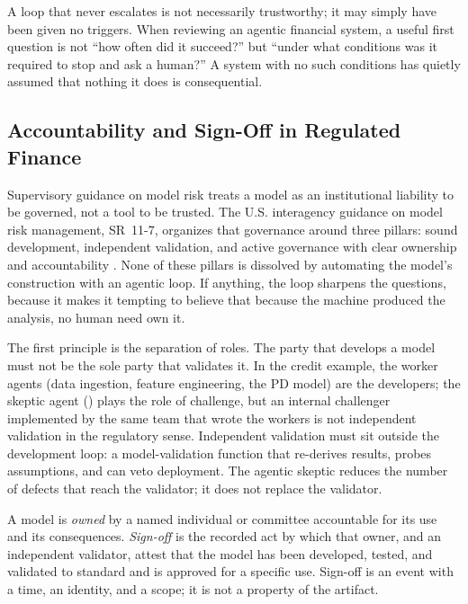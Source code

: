 \begin{remark}
A loop that never escalates is not necessarily trustworthy; it may simply have
been given no triggers. When reviewing an agentic financial system, a useful
first question is not ``how often did it succeed?'' but ``under what conditions
was it required to stop and ask a human?'' A system with no such conditions has
quietly assumed that nothing it does is consequential.
\end{remark}

\subsection{Accountability and Sign-Off in Regulated Finance}\label{subsec:accountability-signoff}

Supervisory guidance on model risk treats a model as an institutional liability
to be governed, not a tool to be trusted. The U.S. interagency guidance on model
risk management, SR~11-7, organizes that governance around three pillars:
sound development, independent validation, and active governance with clear
ownership and accountability \citep{sr117}. None of these pillars is dissolved
by automating the model's construction with an agentic loop. If anything, the
loop sharpens the questions, because it makes it tempting to believe that
because the machine produced the analysis, no human need own it.

The first principle is the separation of roles. The party that develops a model
must not be the sole party that validates it. In the credit example, the
worker agents (data ingestion, feature engineering, the PD model) are the
developers; the skeptic agent () plays the role of
challenge, but an internal challenger implemented by the same team that wrote
the workers is not independent validation in the regulatory sense. Independent
validation must sit outside the development loop: a model-validation function
that re-derives results, probes assumptions, and can veto deployment. The
agentic skeptic reduces the number of defects that reach the validator; it does
not replace the validator.

\begin{definition}\label{def:model-ownership}
A model is \emph{owned} by a named individual or committee accountable for its
use and its consequences. \emph{Sign-off} is the recorded act by which that
owner, and an independent validator, attest that the model has been developed,
tested, and validated to standard and is approved for a specific use. Sign-off
is an event with a time, an identity, and a scope; it is not a property of the
artifact.
\end{definition}

